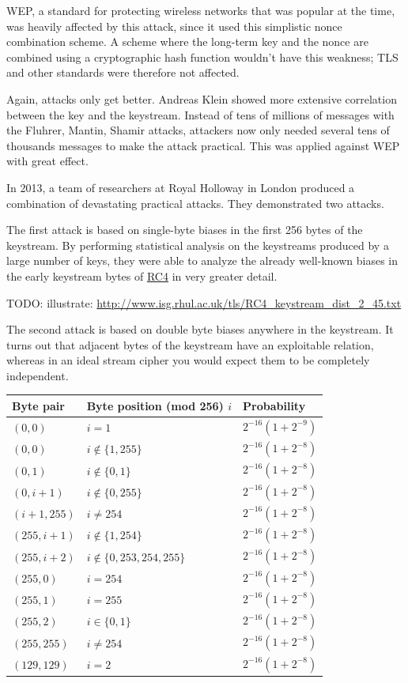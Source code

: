 \documentclass[11pt,ebook,table,dvipsnames]{memoir}
\begin{document}
WEP, a standard for protecting wireless networks that was popular at
the time, was heavily affected by this attack, since it used this
simplistic nonce combination scheme. A scheme where the long-term key
and the nonce are combined using a cryptographic hash function
wouldn't have this weakness; TLS and other standards were therefore
not affected.

Again, attacks only get better. Andreas Klein showed more extensive
correlation between the key and the keystream\cite{klein:rc4}. Instead
of tens of millions of messages with the Fluhrer, Mantin, Shamir
attacks, attackers now only needed several tens of thousands messages
to make the attack practical. This was applied against WEP with great
effect.

In 2013, a team of researchers at Royal Holloway in London produced a
combination of devastating practical attacks\cite{rhul:rc4}. They
demonstrated two attacks.

The first attack is based on single-byte biases in the first 256 bytes
of the keystream. By performing statistical analysis on the keystreams
produced by a large number of keys, they were able to analyze the
already well-known biases in the early keystream bytes of \hyperref[RC4]{RC4} in very
greater detail.

TODO: illustrate: \url{http://www.isg.rhul.ac.uk/tls/RC4_keystream_dist_2_45.txt}

The second attack is based on double byte biases anywhere in the
keystream. It turns out that adjacent bytes of the keystream have an
exploitable relation, whereas in an ideal stream cipher you would
expect them to be completely independent.

\begin{center}
\begin{tabular}{lll}
Byte pair & Byte position (mod 256) $i$ & Probability\\
\hline
$(0, 0)$ & $i = 1$ & $2^{-16} (1 + 2^{-9})$\\
$(0, 0)$ & $i \not \in \{{1, 255}\}$ & $2^{-16} (1 + 2^{-8})$\\
$(0, 1)$ & $i \not \in \{{0, 1}\}$ & $2^{-16} (1 + 2^{-8})$\\
$(0, i + 1)$ & $i \not \in \{{0, 255}\}$ & $2^{-16} (1 + 2^{-8})$\\
$(i + 1, 255)$ & $i \ne 254$ & $2^{-16} (1 + 2^{-8})$\\
$(255, i + 1)$ & $i \not \in \{{1, 254}\}$ & $2^{-16} (1 + 2^{-8})$\\
$(255, i + 2)$ & $i \not \in \{{0, 253, 254, 255}\}$ & $2^{-16} (1 + 2^{-8})$\\
$(255, 0)$ & $i = 254$ & $2^{-16} (1 + 2^{-8})$\\
$(255, 1)$ & $i = 255$ & $2^{-16} (1 + 2^{-8})$\\
$(255, 2)$ & $i \in \{{0, 1}\}$ & $2^{-16} (1 + 2^{-8})$\\
$(255, 255)$ & $i \ne 254$ & $2^{-16} (1 + 2^{-8})$\\
$(129, 129)$ & $i = 2$ & $2^{-16} (1 + 2^{-8})$\\
\end{tabular}
\end{center}
\end{document}

